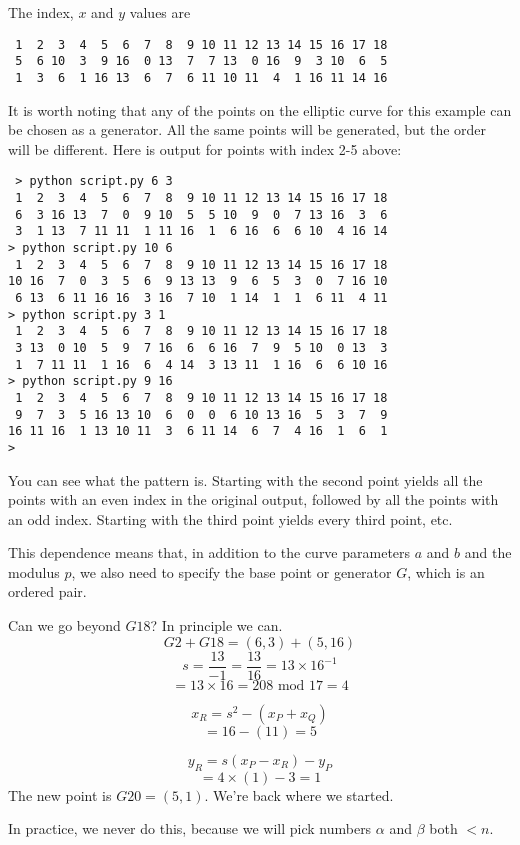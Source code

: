 \documentclass[11pt, oneside]{article}
\begin{document}
The index, $x$ and $y$ values are

\begin{verbatim}
 1  2  3  4  5  6  7  8  9 10 11 12 13 14 15 16 17 18
 5  6 10  3  9 16  0 13  7  7 13  0 16  9  3 10  6  5
 1  3  6  1 16 13  6  7  6 11 10 11  4  1 16 11 14 16
\end{verbatim}

It is worth noting that any of the points on the elliptic curve for this example can be chosen as a generator.  All the same points will be generated, but the order will be different.  Here is output for points with index 2-5 above:

\begin{verbatim}
 > python script.py 6 3
 1  2  3  4  5  6  7  8  9 10 11 12 13 14 15 16 17 18
 6  3 16 13  7  0  9 10  5  5 10  9  0  7 13 16  3  6
 3  1 13  7 11 11  1 11 16  1  6 16  6  6 10  4 16 14
> python script.py 10 6
 1  2  3  4  5  6  7  8  9 10 11 12 13 14 15 16 17 18
10 16  7  0  3  5  6  9 13 13  9  6  5  3  0  7 16 10
 6 13  6 11 16 16  3 16  7 10  1 14  1  1  6 11  4 11
> python script.py 3 1
 1  2  3  4  5  6  7  8  9 10 11 12 13 14 15 16 17 18
 3 13  0 10  5  9  7 16  6  6 16  7  9  5 10  0 13  3
 1  7 11 11  1 16  6  4 14  3 13 11  1 16  6  6 10 16
> python script.py 9 16
 1  2  3  4  5  6  7  8  9 10 11 12 13 14 15 16 17 18
 9  7  3  5 16 13 10  6  0  0  6 10 13 16  5  3  7  9
16 11 16  1 13 10 11  3  6 11 14  6  7  4 16  1  6  1
>\end{verbatim}

You can see what the pattern is.  Starting with the second point yields all the points with an even index in the original output, followed by all the points with an odd index.  Starting with the third point yields every third point, etc.

This dependence means that, in addition to the curve parameters $a$ and $b$ and the modulus $p$, we also need to specify the base point or generator $G$, which is an ordered pair.

Can we go beyond $G18$?  In principle we can.
\[ G2 + G18 = (6,3) + (5,16) \]
\[ s = \frac{13}{-1} = \frac{13}{16} = 13 \times 16^{-1} \]
\[ = 13 \times 16 = 208 \text{ mod } 17 = 4  \]

\[ x_R = s^2 - (x_P + x_Q) \]
\[ = 16 - (11) = 5 \]

\[ y_R = s(x_P - x_R) - y_P \]
\[ = 4 \times (1) - 3 = 1 \]
The new point is $G20 = (5,1)$.  We're back where we started.

In practice, we never do this, because we will pick numbers $\alpha$ and $\beta$ both $ < n$.
\end{document}

